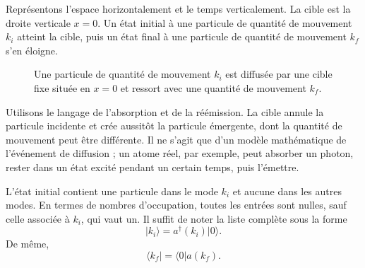 Représentons l’espace horizontalement et le temps verticalement. La cible est la droite verticale \(x=0\). Un état initial à une particule de quantité de mouvement \(k_i\) atteint la cible, puis un état final à une particule de quantité de mouvement \(k_f\) s’en éloigne.

\begin{figure}[h]\centering
{}\caption{Une particule de quantité de mouvement \(k_i\) est diffusée par une cible fixe située en \(x=0\) et ressort avec une quantité de mouvement \(k_f\).}\end{figure}

Utilisons le langage de l’absorption et de la réémission. La cible annule la particule incidente et crée aussitôt la particule émergente, dont la quantité de mouvement peut être différente. Il ne s’agit que d’un modèle mathématique de l’événement de diffusion ; un atome réel, par exemple, peut absorber un photon, rester dans un état excité pendant un certain temps, puis l’émettre.

\begin{classroomqa}\end{classroomqa}

L’état initial contient une particule dans le mode \(k_i\) et aucune dans les autres modes. En termes de nombres d’occupation, toutes les entrées sont nulles, sauf celle associée à \(k_i\), qui vaut un. Il suffit de noter la liste complète sous la forme
\begin{equation}
\lvert k_i\rangle=a^\dagger(k_i)\lvert0\rangle.
\end{equation}
De même,
\begin{equation}
\langle k_f\rvert=\langle0\rvert a(k_f).
\end{equation}

